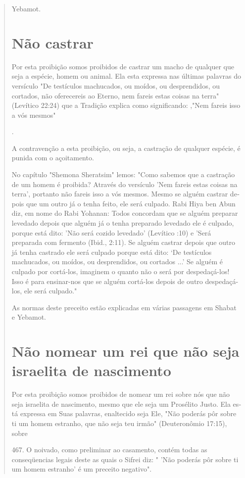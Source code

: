 \begin{quote}
Yebamot.

\section{Não castrar}

Por esta proibição somos proibidos de castrar um macho de qual­quer que
seja a espécie, homem ou animal. Ela esta expressa nas últimas pala­vras
do versículo "De testículos machucados, ou moídos, ou desprendidos, ou
cortados, não oferecereis ao Eterno, nem fareis estas coisas na terra"
(Levítico 22:24) que a Tradição explica como significando: ,"Nem fareis
isso a vós mesmos"

.

A contravenção a esta proibição, ou seja, a castração de qualquer
es­pécie, é punida com o açoitamento.

No capítulo "Shemona Sheratsim" lemos: "Como sabemos que a cas­tração de
um homem é proibida? Através do versículo 'Nem fareis estas coisas na
terra', portanto não fareis isso a vós mesmos. Mesmo se alguém castrar
de­pois que um outro já o tenha feito, ele será culpado. Rabi Hiya ben
Abun diz, em nome do Rabi Yohanan: Todos concordam que se alguém
preparar leveda­do depois que alguém já o tenha preparado levedado ele é
culpado, porque está dito: 'Não será cozido levedado' (Levítico :10) e
'Será preparada com fer­mento (Ibid., 2:11). Se alguém castrar depois
que outro já tenha castrado ele será culpado porque está dito: `De
testículos machucados, ou moídos, ou des­prendidos, ou cortados ...' Se
alguém é culpado por cortá-los, imaginem o quanto não o será por
despedaçá-los! Isso é para ensinar-nos que se alguém cortá-los depois de
outro despedaçá-los, ele será culpado."

As normas deste preceito estão explicadas em várias passagens em Shabat
e Yebamot.

\section{Não nomear um rei que não seja israelita de nascimento}

Por esta proibição somos proibidos de nomear um rei sobre nós que não
seja israelita de nascimento, mesmo que ele seja um Prosélito Justo. Ela
es­tá expressa em Suas palavras, enaltecido seja Ele, "Não poderás pôr
sobre ti um homem estranho, que não seja teu irmão" (Deuteronômio
17:15), sobre

467. O noivado, como preliminar ao casamento, contém todas as
conseqüencias legais deste
as quais o Sifrei diz: " 'Não poderás pôr sobre ti um homem estranho' é
um preceito negativo".


\end{quote}

